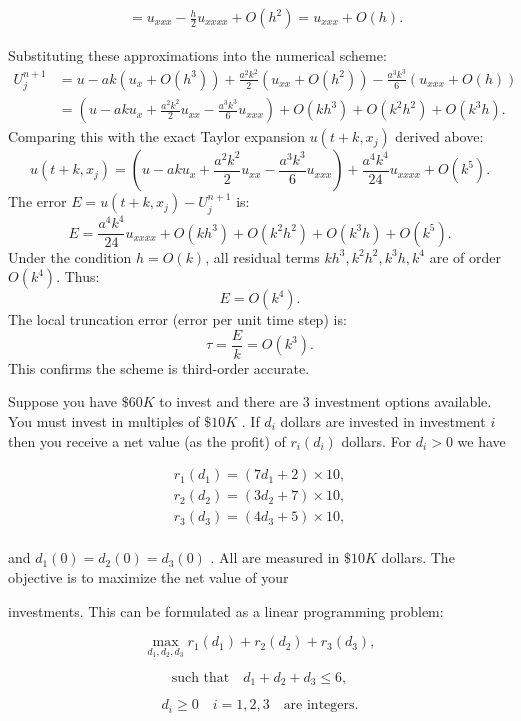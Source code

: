 \begin{solution}
\begin{enumerate}[label=(\alph*)]
\begin{itemize}
\begin{align*}
        &= u_{xxx} - \frac{h}{2} u_{xxxx} + O(h^2) = u_{xxx} + O(h).
        \end{align*}
    \end{itemize}
    Substituting these approximations into the numerical scheme:
    \begin{align*}
    U_j^{n+1} &= u - ak(u_x + O(h^3)) + \frac{a^2k^2}{2}(u_{xx} + O(h^2)) - \frac{a^3k^3}{6}(u_{xxx} + O(h)) \\
    &= (u - ak u_x + \frac{a^2k^2}{2} u_{xx} - \frac{a^3k^3}{6} u_{xxx}) + O(kh^3) + O(k^2h^2) + O(k^3h).
    \end{align*}
    Comparing this with the exact Taylor expansion $u(t+k, x_j)$ derived above:
    \[ u(t+k, x_j) = (u - ak u_x + \frac{a^2k^2}{2} u_{xx} - \frac{a^3k^3}{6} u_{xxx}) + \frac{a^4k^4}{24} u_{xxxx} + O(k^5). \]
    The error $E = u(t+k, x_j) - U_j^{n+1}$ is:
    \[ E = \frac{a^4k^4}{24} u_{xxxx} + O(kh^3) + O(k^2h^2) + O(k^3h) + O(k^5). \]
    Under the condition $h = O(k)$, all residual terms $kh^3, k^2h^2, k^3h, k^4$ are of order $O(k^4)$. Thus:
    \[ E = O(k^4). \]
    The local truncation error (error per unit time step) is:
    \[ \tau = \frac{E}{k} = O(k^3). \]
    This confirms the scheme is third-order accurate.
\end{enumerate}
\end{solution}

\begin{exercise}
\label{applied:2022:6}
Suppose you have $\$ 60 K$ to invest and there are 3 investment options available. You must invest in multiples of $\$ 10K$ . If $d _ { i }$ dollars are invested in investment $i$ then you receive a net value (as the profit) of $r _ { i } ( d _ { i } )$ dollars. For $d _ { i } > 0$ we have

\[
\begin{array}{l} r _ {1} (d _ {1}) = (7 d _ {1} + 2) \times 10, \\ r _ {2} (d _ {2}) = (3 d _ {2} + 7) \times 10, \\ r _ {3} (d _ {3}) = (4 d _ {3} + 5) \times 10, \\ \end{array}
\]

and $d _ { 1 } ( 0 ) = d _ { 2 } ( 0 ) = d _ { 3 } ( 0 )$ . All are measured in $\$ 10K$ dollars. The objective is to maximize the net value of your

investments. This can be formulated as a linear programming problem:

\[
\max _ {d _ {1}, d _ {2}, d _ {3}} r _ {1} (d _ {1}) + r _ {2} (d _ {2}) + r _ {3} (d _ {3}),
\]

\[
\text{such that}\quad d_1 + d_2 + d_3 \leq 6,
\]

\[
d_i \geq 0\quad i = 1, 2, 3\quad \text{are integers}.
\]
\end{exercise}

